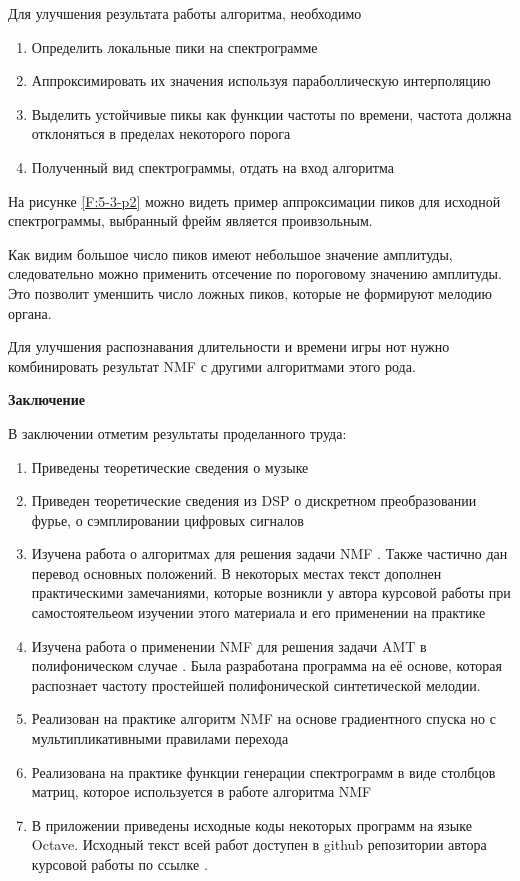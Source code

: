 \documentclass[oneside, final, 12pt]{extarticle}
\begin{document}
Для улучшения результата работы алгоритма, необходимо
\begin{enumerate}
  \item Определить локальные пики на спектрограмме
  \item Аппроксимировать их значения используя параболлическую интерполяцию
  \item Выделить устойчивые пикы как функции частоты по времени,
    частота должна отклоняться в пределах некоторого порога
  \item Полученный вид спектрограммы, отдать на вход алгоритма
\end{enumerate}

На рисунке \ref{F:5-3-p2} можно видеть пример аппроксимации пиков
для исходной спектрограммы, выбранный фрейм является проивзольным.

Как видим большое число пиков имеют небольшое значение амплитуды, следовательно
можно применить отсечение по пороговому значению амплитуды. Это позволит
уменшить число ложных пиков, которые не формируют мелодию органа.

Для улучшения распознавания длительности и времени игры нот
нужно комбинировать результат NMF с другими алгоритмами этого рода.

\cleardoublepage



\cleardoublepage

{\large \bf Заключение \\}
  В заключении отметим результаты проделанного труда:
  \begin{enumerate}
    \item Приведены теоретические сведения о музыке
    \item Приведен теоретические сведения из DSP о дискретном
      преобразовании фурье, о сэмплировании цифровых сигналов
    \item Изучена работа о алгоритмах для решения задачи NMF \cite{DDL}.
      Также частично дан перевод основных положений. В некоторых
      местах текст дополнен практическими замечаниями, которые
      возникли у автора курсовой работы при самостоятельеом изучении
      этого материала и его применении на практике
    \item Изучена работа о применении NMF для решения задачи AMT
      в полифоническом случае \cite{PMTPS}. Была разработана
      программа на её основе, которая распознает частоту
      простейшей полифонической синтетической мелодии.
    \item Реализован на практике алгоритм NMF на основе градиентного
      спуска но с мультипликативными правилами перехода
    \item Реализована на практике функции генерации спектрограмм
      в виде столбцов матриц, которое используется в работе алгоритма
      NMF
    \item В приложении приведены исходные коды некоторых программ
      на языке Octave. Исходный текст всей работ доступен в github
      репозитории автора курсовой работы по ссылке \cite{L:course-paper}.
  \end{enumerate}
\end{document}
